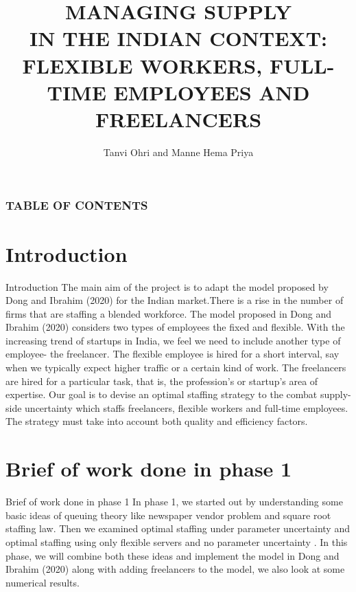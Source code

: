 \documentclass[8pt]{beamer}
\title{MANAGING SUPPLY \\ IN THE INDIAN CONTEXT:
\\FLEXIBLE WORKERS, FULL-TIME EMPLOYEES AND FREELANCERS}
\author{Tanvi Ohri and Manne Hema Priya}
\institute{}
\begin{document}
\titlepage

\begin{frame}

 \frametitle{TABLE OF CONTENTS}
 \tableofcontents
\end{frame}
\section{Introduction}
\begin{frame}{Introduction}
    The main aim of the project is to adapt the model proposed by Dong and Ibrahim (2020) \cite{dong} for the Indian market.There is a rise in the number of firms that are staffing a blended workforce. The model proposed in Dong and Ibrahim (2020) \cite{dong} considers two types of employees the fixed and flexible. With the increasing trend of startups in India, we feel we need to include another type of employee- the freelancer. The flexible employee is hired for a short interval, say when we typically expect higher traffic or a certain kind of work. The freelancers are hired for a particular task, that is, the profession's or startup's area of expertise. Our goal is to devise an optimal staffing strategy to the combat supply-side uncertainty which staffs freelancers, flexible workers and full-time employees. The strategy must take into account both quality and efficiency factors.
\end{frame}
\section{Brief of work done in phase 1}
\begin{frame}{Brief of work done in phase 1}
    In phase 1, we started out by understanding some basic ideas of queuing theory like newspaper vendor problem\cite{newsvendor} and square root staffing law. Then we examined optimal staffing under parameter uncertainty \cite{bassamboo} and optimal staffing using only flexible servers and no parameter uncertainty \cite{ibrahim}. In this phase, we will combine both these ideas and implement the model in Dong and Ibrahim (2020)\cite{dong} along with adding freelancers to the model, we also look at some numerical results.
\end{frame}
\end{document}
